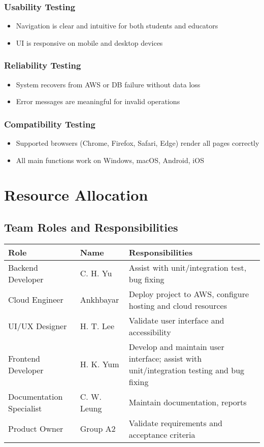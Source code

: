 \documentclass[a4paper,11pt]{scrartcl}
\begin{document}
\subsubsection{Usability Testing}
\begin{itemize}[leftmargin=*]
    \item Navigation is clear and intuitive for both students and educators
    \item UI is responsive on mobile and desktop devices
\end{itemize}

\subsubsection{Reliability Testing}
\begin{itemize}[leftmargin=*]
    \item System recovers from AWS or DB failure without data loss
    \item Error messages are meaningful for invalid operations
\end{itemize}

\subsubsection{Compatibility Testing}
\begin{itemize}[leftmargin=*]
    \item Supported browsers (Chrome, Firefox, Safari, Edge) render all pages correctly
    \item All main functions work on Windows, macOS, Android, iOS
\end{itemize}

\section{Resource Allocation}

\subsection{Team Roles and Responsibilities}
\begin{tabularx}{\textwidth}{l l X}
\toprule
Role & Name & Responsibilities \\
\midrule
Backend Developer & C. H. Yu & Assist with unit/integration test, bug fixing \\
Cloud Engineer & Ankhbayar & Deploy project to AWS, configure hosting and cloud resources \\
UI/UX Designer & H. T. Lee & Validate user interface and accessibility \\
Frontend Developer & H. K. Yum & Develop and maintain user interface; assist with unit/integration testing and bug fixing \\
Documentation Specialist & C. W. Leung & Maintain documentation, reports \\
Product Owner & Group A2 & Validate requirements and acceptance criteria \\
\bottomrule
\end{tabularx}
\end{document}
